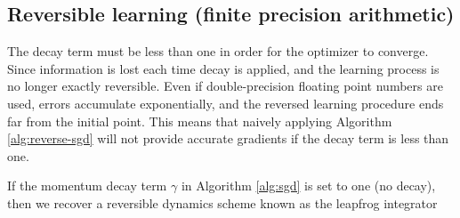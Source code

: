 \documentclass{article}
\newcommand{\decay}{\gamma}
\begin{document}
%


\subsection{Reversible learning (finite precision arithmetic)}
The decay term must be less than one in order for the optimizer to converge.
Since information is lost each time decay is applied, and the learning process is no longer exactly reversible.
Even if double-precision floating point numbers are used, errors accumulate exponentially, and the reversed learning procedure ends far from the initial point.
This means that naively applying Algorithm \ref{alg:reverse-sgd} will not provide accurate gradients if the decay term is less than one.

If the momentum decay term $\decay$ in Algorithm \ref{alg:sgd} is set to one (no
decay), then we recover a reversible dynamics scheme known as the leapfrog
integrator~\citep{leapfrog1995}
\end{document}
